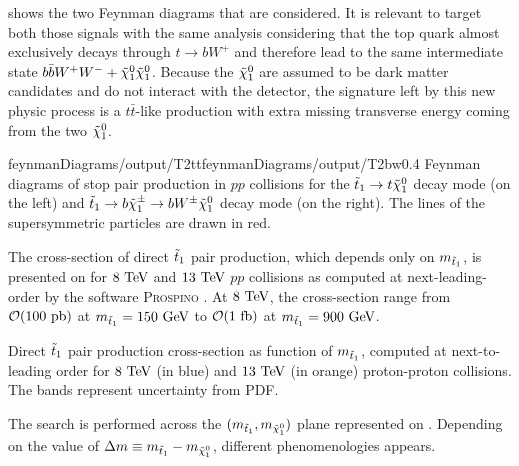          shows the two Feynman diagrams that are
        considered. It is relevant to target both those signals with the same analysis
        considering that the top quark almost exclusively decays through $t \rightarrow
        b W^+$ and therefore lead to the same intermediate state $b \bar{b} W^+ W^- +
        \tilde{\chi}_1^0 \tilde{\chi}_1^0$. Because the $\tilde{\chi}_1^0$ are assumed to be dark
        matter candidates and do not interact with the detector, the signature left by
        this new physic process is a $t\bar{t}$-like production with extra missing
        transverse energy coming from the two $\tilde{\chi}_1^0$.

                         {feynmanDiagrams/output/T2tt}{feynmanDiagrams/output/T2bw}{0.4}
                         {Feynman diagrams of stop pair production in $pp$ collisions for the
                         $\tilde{t}_1 \rightarrow t \tilde{\chi}_1^0$ decay mode (on the left) and
                         $\tilde{t}_1 \rightarrow b \tilde{\chi}_1^\pm \rightarrow b W^{\pm} \tilde{\chi}_1^0$ decay mode
                         (on the right). The lines of the supersymmetric particles are drawn in red.}

        The cross-section of direct $\tilde{t}_1$ pair production, which depends only on $m_{\tilde{t}_1}$, is presented
        on  for $8~\text{TeV}$ and $13~\text{TeV}$ $pp$ collisions as computed at next-leading-order
        by the software \textsc{Prospino} . At $8~\text{TeV}$, the cross-section range from $\mathcal{O}(100~\text{pb})$
        at $m_{\tilde{t}_1} = 150~\text{GeV}$ to $\mathcal{O}(1~\text{fb})$ at $m_{\tilde{t}_1} = 900 ~\text{GeV}$.

        {Direct $\tilde{t}_1$ pair production cross-section as function of $m_{\tilde{t}_1}$, computed at next-to-leading order
        for $8~\text{TeV}$ (in blue) and $13~\text{TeV}$ (in orange) proton-proton collisions. The bands represent uncertainty from PDF.}

        The search is performed across the $(m_{\tilde{t}_1},m_{\tilde{\chi}_1^0})$ plane
        represented on . Depending on the value of
        $\Delta m \equiv m_{\tilde{t}_1} - m_{\tilde{\chi}_1^0}$, different phenomenologies
        appears.

